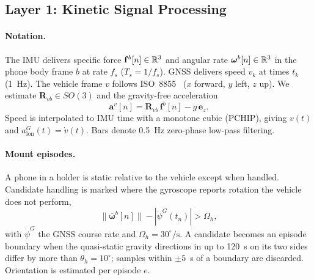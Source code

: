 \subsection{Layer 1: Kinetic Signal Processing}
\label{sec:layer1}

\paragraph{Notation.}
The IMU delivers specific force $\mathbf f^b[n]\in\mathbb{R}^3$ and angular rate $\boldsymbol\omega^b[n]\in\mathbb{R}^3$ in the phone body frame $b$ at rate $f_s$ ($T_s=1/f_s$).
GNSS delivers speed $v_k$ at times $t_k$ (1~Hz).
The vehicle frame $v$ follows ISO~8855~\cite{iso8855} ($x$ forward, $y$ left, $z$ up).
We estimate $\mathbf R_{vb}\in SO(3)$ and the gravity-free acceleration
\begin{equation}
  \mathbf a^v[n]=\mathbf R_{vb}\,\mathbf f^b[n]-g\,\mathbf e_z .
  \label{eq:av}
\end{equation}
Speed is interpolated to IMU time with a monotone cubic (PCHIP), giving $v(t)$ and $a^G_{\mathrm{lon}}(t)=\dot v(t)$.
Bars denote 0.5~Hz zero-phase low-pass filtering.

\paragraph{Mount episodes.}
A phone in a holder is static relative to the vehicle except when handled.
Candidate handling is marked where the gyroscope reports rotation the vehicle does not perform,
\begin{equation}
\lVert\bar{\boldsymbol\omega}^b[n]\rVert-|\dot\psi^G(t_n)|>\Omega_h ,
\end{equation}
with $\dot\psi^G$ the GNSS course rate and $\Omega_h=30^\circ/\mathrm s$.
A candidate becomes an episode boundary when the quasi-static gravity directions in up to 120~s on its two sides differ by more than $\theta_h=10^\circ$; samples within $\pm5$~s of a boundary are discarded.
Orientation is estimated per episode $e$.

